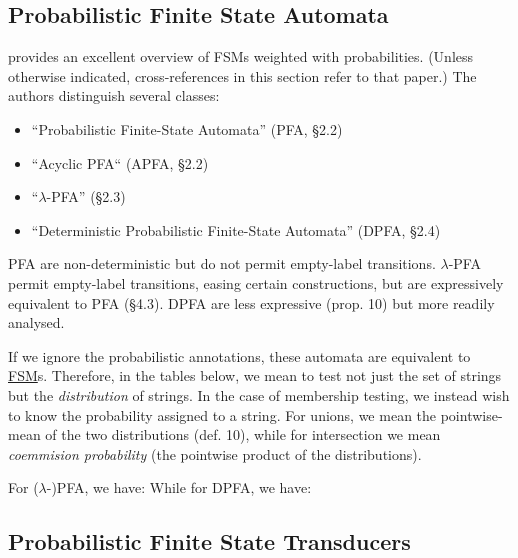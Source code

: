 \subsection{Probabilistic Finite State Automata}

\cite{vidal:pfsm} provides an excellent overview of FSMs weighted with
probabilities.  (Unless otherwise indicated, cross-references in this section
refer to that paper.)  The authors distinguish several classes:
%
\begin{itemize}
%
  \item ``Probabilistic Finite-State Automata'' (PFA, \S2.2)
%
  \item ``Acyclic PFA`` (APFA, \S2.2)
%
  \item ``$\lambda$-PFA'' (\S2.3)
%
  \item ``Deterministic Probabilistic Finite-State Automata'' (DPFA, \S2.4)
%
\end{itemize}
PFA are non-deterministic but do not permit empty-label transitions.
$\lambda$-PFA permit empty-label transitions, easing certain constructions,
but are expressively equivalent to PFA (\S4.3).  DPFA are less expressive
(prop. 10) but more readily analysed.

If we ignore the probabilistic annotations, these automata are equivalent to
\hyperref[sec:zoo-str/fsm]{FSM}s.  Therefore, in the tables below, we mean
to test not just the set of strings but the {\em distribution} of strings.
In the case of membership testing, we instead wish to know the
probability assigned to a string.  For unions, we mean the pointwise-mean
of the two distributions (def. 10), while for intersection we mean {\em
coemmision probability} (the pointwise product of the distributions).

For ($\lambda$-)PFA, we have:
While for DPFA, we have:


\subsection{Probabilistic Finite State Transducers}

